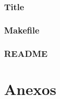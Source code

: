\subsubsection{Title}

\subsubsection{Makefile}

\subsubsection{README}\label{README}


\onecolumn
\section{Anexos}\label{anexo}



%



